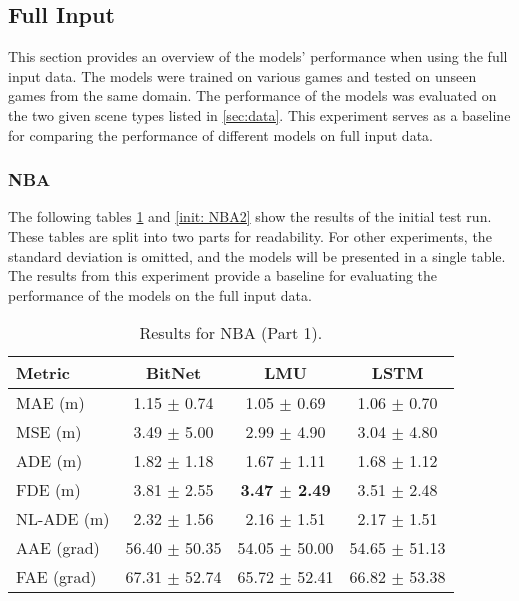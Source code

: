 \subsection{Full Input}
\label{exp:init}
This section provides an overview of the models' performance when using the full input data. The models were trained on various games and tested on unseen games from the same domain. The performance of the models was evaluated on the two given scene types listed in \ref{sec:data}. This experiment serves as a baseline for comparing the performance of different models on full input data.

\subsubsection{NBA}
The following tables \ref{init: NBA1} and \ref{init: NBA2} show the results of the initial test run. These tables are split into two parts for readability. For other experiments, the standard deviation is omitted, and the models will be presented in a single table. The results from this experiment provide a baseline for evaluating the performance of the models on the full input data.

\begin{table}[H]
\centering
\caption{Results for NBA (Part 1).}
\label{init: NBA1}
\begin{tabular}{l||c|c|c}
Metric & BitNet & LMU & LSTM \\
\hline \hline
MAE (m) & 1.15 $\pm$ 0.74 & 1.05 $\pm$ 0.69 & 1.06 $\pm$ 0.70 \\
MSE (m) & 3.49 $\pm$ 5.00 & 2.99 $\pm$ 4.90 & 3.04 $\pm$ 4.80 \\
ADE (m) & 1.82 $\pm$ 1.18 & 1.67 $\pm$ 1.11 & 1.68 $\pm$ 1.12 \\
FDE (m) & 3.81 $\pm$ 2.55 & \textbf{3.47 $\pm$ 2.49} & 3.51 $\pm$ 2.48 \\
NL-ADE (m) & 2.32 $\pm$ 1.56 & 2.16 $\pm$ 1.51 & 2.17 $\pm$ 1.51 \\
AAE (grad) & 56.40 $\pm$ 50.35 & 54.05 $\pm$ 50.00 & 54.65 $\pm$ 51.13 \\
FAE (grad) & 67.31 $\pm$ 52.74 & 65.72 $\pm$ 52.41 & 66.82 $\pm$ 53.38 \\
\end{tabular}
\end{table}

